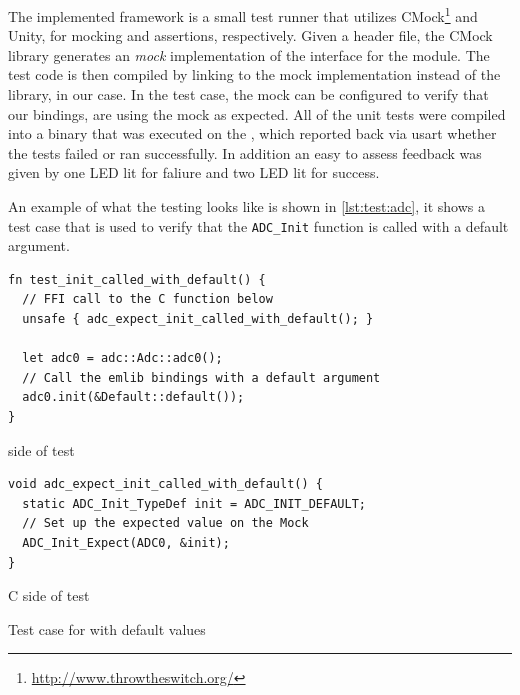 The implemented framework is a small test runner that utilizes CMock\footnote{\url{http://www.throwtheswitch.org/}\label{foot:throw}} and Unity, for mocking and assertions, respectively.
Given a {\C} header file, the CMock library generates an \emph{mock} implementation of the interface for the module.
The test code is then compiled by linking to the mock implementation instead of the library, {\emlib} in our case.
In the test case, the mock can be configured to verify that our bindings, are using the mock as expected.
All of the unit tests were compiled into a binary that was executed on the {\gecko}, which reported back via \gls{usart} whether the tests failed or ran successfully.
In addition an easy to assess feedback was given by one LED lit for faliure and two LED lit for success.

An example of what the testing looks like is shown in \autoref{lst:test:adc}, it shows a test case that is used to verify that the \texttt{ADC\_Init} function is called with a default argument.

\begin{listing}[H]
  \centering
  \begin{minipage}{\textwidth}
  \begin{listing}
    \begin{verbatim}
fn test_init_called_with_default() {
  // FFI call to the C function below
  unsafe { adc_expect_init_called_with_default(); }

  let adc0 = adc::Adc::adc0();
  // Call the emlib bindings with a default argument
  adc0.init(&Default::default());
}
    \end{verbatim}
    \caption{{\rust} side of  test}
    \label{lst:test:adc:rust}
  \end{listing}
  \end{minipage}

  \begin{minipage}{\textwidth}
  \begin{listing}
    \begin{verbatim}
void adc_expect_init_called_with_default() {
  static ADC_Init_TypeDef init = ADC_INIT_DEFAULT;
  // Set up the expected value on the Mock
  ADC_Init_Expect(ADC0, &init);
}
    \end{verbatim}
    \caption{C side of  test}
    \label{lst:test:adc:c}
  \end{listing}
  \end{minipage}

  \caption{Test case for  with default values}
  \label{lst:test:adc}
\end{listing}

